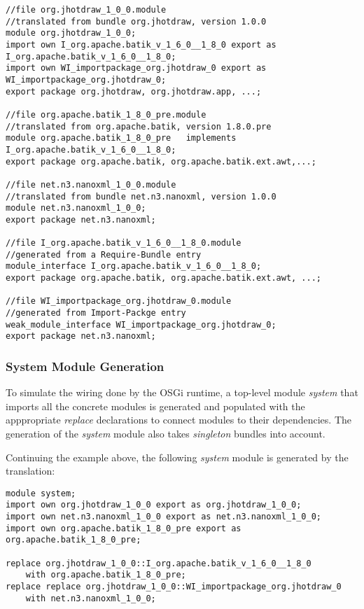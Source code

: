 \begin{lstlisting}[caption=Translated Bundles]
//file org.jhotdraw_1_0_0.module
//translated from bundle org.jhotdraw, version 1.0.0
module org.jhotdraw_1_0_0;
import own I_org.apache.batik_v_1_6_0__1_8_0 export as I_org.apache.batik_v_1_6_0__1_8_0;
import own WI_importpackage_org.jhotdraw_0 export as WI_importpackage_org.jhotdraw_0;
export package org.jhotdraw, org.jhotdraw.app, ...;

//file org.apache.batik_1_8_0_pre.module
//translated from org.apache.batik, version 1.8.0.pre
module org.apache.batik_1_8_0_pre	implements I_org.apache.batik_v_1_6_0__1_8_0;
export package org.apache.batik, org.apache.batik.ext.awt,...;

//file net.n3.nanoxml_1_0_0.module
//translated from bundle net.n3.nanoxml, version 1.0.0
module net.n3.nanoxml_1_0_0;
export package net.n3.nanoxml;

//file I_org.apache.batik_v_1_6_0__1_8_0.module
//generated from a Require-Bundle entry
module_interface I_org.apache.batik_v_1_6_0__1_8_0;
export package org.apache.batik, org.apache.batik.ext.awt, ...;

//file WI_importpackage_org.jhotdraw_0.module
//generated from Import-Packge entry
weak_module_interface WI_importpackage_org.jhotdraw_0;
export package net.n3.nanoxml;
\end{lstlisting}

\subsubsection{System Module Generation}

To simulate the wiring done by the OSGi runtime, a top-level module \textit{system} that imports all 
the concrete modules is generated and populated with the apppropriate \textit{replace} declarations to connect modules to
their dependencies. The generation of the \textit{system} module also takes \textit{singleton}
bundles into account.

Continuing the example above, the following \textit{system} module is generated by the translation:

\begin{lstlisting}[caption=Generated System Module]
module system;
import own org.jhotdraw_1_0_0 export as org.jhotdraw_1_0_0;
import own net.n3.nanoxml_1_0_0 export as net.n3.nanoxml_1_0_0;
import own org.apache.batik_1_8_0_pre export as org.apache.batik_1_8_0_pre;

replace org.jhotdraw_1_0_0::I_org.apache.batik_v_1_6_0__1_8_0
	with org.apache.batik_1_8_0_pre;
replace replace org.jhotdraw_1_0_0::WI_importpackage_org.jhotdraw_0
	with net.n3.nanoxml_1_0_0;
\end{lstlisting}

